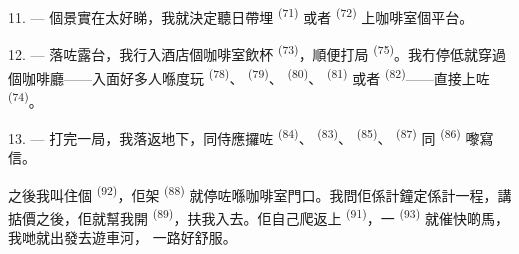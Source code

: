 \VUsaut{3.0mm}
\VUsaut{3.0mm}

11. --- 個景實在太好睇，我就決定聽日帶埋 \textsuperscript{(71)}
或者 \textsuperscript{(72)} 上咖啡室個平台。

12. --- 落咗露台，我行入酒店個咖啡室飲杯 \textsuperscript{(73)}，順便打局
 \textsuperscript{(75)}。我冇停低就穿過個咖啡廳——入面好多人喺度玩
 \textsuperscript{(78)}、 \textsuperscript{(79)}、
 \textsuperscript{(80)}、 \textsuperscript{(81)} 或者
 \textsuperscript{(82)}——直接上咗 \textsuperscript{(74)}。

13. --- 打完一局，我落返地下，同侍應攞咗 \textsuperscript{(84)}、
 \textsuperscript{(83)}、 \textsuperscript{(85)}、
\textsuperscript{(87)} 同 \textsuperscript{(86)} 嚟寫信。

之後我叫住個 \textsuperscript{(92)}，佢架 \textsuperscript{(88)}
就停咗喺咖啡室門口。我問佢係計鐘定係計一程，講掂價之後，佢就幫我開
 \textsuperscript{(89)}，扶我入去。佢自己爬返上
\textsuperscript{(91)}，一 \textsuperscript{(93)} 就催快啲馬，我哋就出發去遊車河，
一路好舒服。

\VUsaut{6.0mm}
\VUfilet{22mm}
